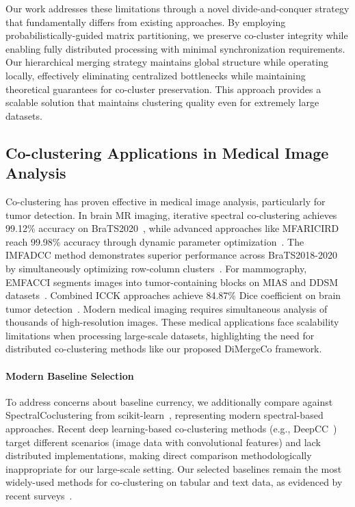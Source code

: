 \documentclass[journal]{IEEEtran}
\theoremstyle{definition}
\theoremstyle{remark} %
\renewcommand{\cite}[1]{~\autocite{#1}}
\begin{document}
Our work addresses these limitations through a novel divide-and-conquer strategy that fundamentally differs from existing approaches. By employing probabilistically-guided matrix partitioning, we preserve co-cluster integrity while enabling fully distributed processing with minimal synchronization requirements. Our hierarchical merging strategy maintains global structure while operating locally, effectively eliminating centralized bottlenecks while maintaining theoretical guarantees for co-cluster preservation. This approach provides a scalable solution that maintains clustering quality even for extremely large datasets.

    {\color{blue}\subsection{Co-clustering Applications in Medical Image Analysis}\label{subsec:medical-image-analysis}
        Co-clustering has proven effective in medical image analysis, particularly for tumor detection. In brain MR imaging, iterative spectral co-clustering achieves 99.12\% accuracy on BraTS2020\cite{farnoosh2024DevelopmentUnsupervisedPseudodeep}, while advanced approaches like MFARICIRD reach 99.98\% accuracy through dynamic parameter optimization\cite{farnoosh2025PseudodeepUnsupervisedModelbased}. The IMFADCC method demonstrates superior performance across BraTS2018-2020 by simultaneously optimizing row-column clusters\cite{farnoosh2024BrainMagneticResonance}. For mammography, EMFACCI segments images into tumor-containing blocks on MIAS and DDSM datasets\cite{farnoosh2024NovelApproachAutomatic}. Combined ICCK approaches achieve 84.87\% Dice coefficient on brain tumor detection\cite{farnoosh2022ApplicationModifiedCombinational}.
        Modern medical imaging requires simultaneous analysis of thousands of high-resolution images. These medical applications face scalability limitations when processing large-scale datasets, highlighting the need for distributed co-clustering methods like our proposed DiMergeCo framework.}

{\color{blue}
\paragraph{Modern Baseline Selection}
To address concerns about baseline currency, we additionally compare against SpectralCoclustering from scikit-learn\cite{sklearn2011}, representing modern spectral-based approaches. Recent deep learning-based co-clustering methods (e.g., DeepCC\cite{dongkuanxu2019DeepCoClustering}) target different scenarios (image data with convolutional features) and lack distributed implementations, making direct comparison methodologically inappropriate for our large-scale setting. Our selected baselines remain the most widely-used methods for co-clustering on tabular and text data, as evidenced by recent surveys\cite{pontes2015BiclusteringReviewSurvey, zhao2021CoclusteringReviewAdvances}.
}
\end{document}
